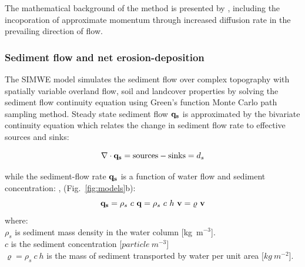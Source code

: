 \documentclass[gmd, manuscript]{copernicus}
\begin{document}
The mathematical background of the method is presented by \cite{Mitas1998,Mitasova2004}, including the incoporation
of approximate momentum through increased diffusion rate in the prevailing direction of flow.


\subsubsection{Sediment flow and net erosion-deposition}

The SIMWE model simulates the sediment flow over complex topography with spatially variable overland flow,
soil and landcover properties by solving  the sediment flow continuity equation
using Green's function Monte Carlo path sampling method.
Steady state sediment flow ${\bf q_s}$ is approximated by
the bivariate continuity equation which relates the change
in sediment flow rate to effective sources and sinks:

\begin{equation}
\label{eq:steady_sed}
\nabla\cdot {\bf q_s} = {\rm sources - sinks}= d_s
\end{equation}
\noindent


while the sediment-flow rate ${\bf q_s}$ is a function of water flow and sediment concentration:
\citep{Mitas1998}, (Fig.~\ref{fig:models}b):
\begin{equation}
\label{eq:sedflow}
  {\bf q_s} = \rho_s~c~{\bf q} = \rho_s~c~h~{\bf v} = \varrho~{\bf v}
\end{equation}
{\small
\noindent
where: \\
\hspace*{0.5em} $\rho_s$ is sediment mass density in the water column [\unit{kg~m}$^{-3}$].\\
\hspace*{0.5em} $c$ is the sediment concentration [$\unit{particle~m^{-3}}$]\\
\hspace*{0.5em} $\varrho = \rho_s~c~h$ is the mass of sediment transported by water per unit area [$\unit{kg~m^{-2}}$]. 
}
\end{document}
